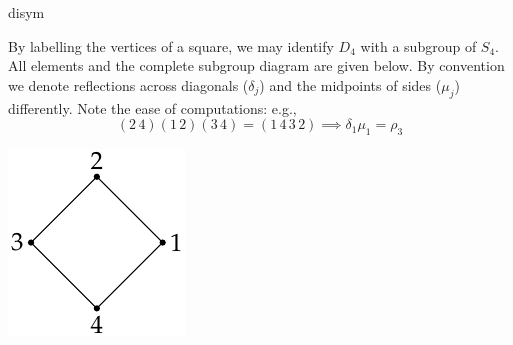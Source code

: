 \begin{examples}{}{disym}
\begin{enumerate}
		\begin{minipage}[t]{0.77\linewidth}\vspace{0pt}
			\item By labelling the vertices of a square, we may identify $D_4$ with a subgroup of $S_4$. All elements and the complete subgroup diagram are given below. By convention we denote reflections across diagonals ($\delta_j$) and the midpoints of sides ($\mu_j$) differently.\smallbreak
			Note the ease of computations: e.g.,
			\[
				(2\,4)(1\,2)(3\,4)=(1\,4\,3\,2)\implies \delta_1\mu_1=\rho_3
			\]
		\end{minipage}
		\hfill
		\begin{minipage}[t]{0.22\linewidth}\vspace{0pt}
			\flushright\includegraphics[scale=0.95]{perm-d4}
		\end{minipage}\medbreak
	
	

\end{enumerate}
\end{examples}

